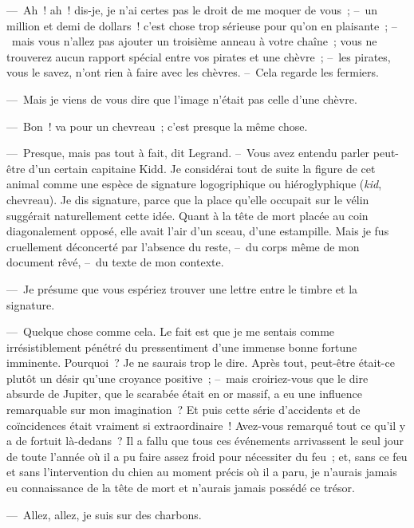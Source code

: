 \documentclass[french,twoside]{book} %
\begin{document}
— Ah ! ah ! dis-je, je n’ai certes pas le droit de me moquer de vous ; – un million et demi de dollars ! c’est chose trop sérieuse pour qu’on en plaisante ; – mais vous n’allez pas ajouter un troisième anneau à votre chaîne ; vous ne trouverez aucun rapport spécial entre vos pirates et une chèvre ; – les pirates, vous le savez, n’ont rien à faire avec les chèvres. – Cela regarde les fermiers.\par
— Mais je viens de vous dire que l’image n’était pas celle d’une chèvre.\par
— Bon ! va pour un chevreau ; c’est presque la même chose.\par
— Presque, mais pas tout à fait, dit Legrand. – Vous avez entendu parler peut-être d’un certain capitaine Kidd. Je considérai tout de suite la figure de cet animal comme une espèce de signature logogriphique ou hiéroglyphique (\emph{kid}, chevreau). Je dis signature, parce que la place qu’elle occupait sur le vélin suggérait naturellement cette idée. Quant à la tête de mort placée au coin diagonalement opposé, elle avait l’air d’un sceau, d’une estampille. Mais je fus cruellement déconcerté par l’absence du reste, – du corps même de mon document rêvé, – du texte de mon contexte.\par
— Je présume que vous espériez trouver une lettre entre le timbre et la signature.\par
— Quelque chose comme cela. Le fait est que je me sentais comme irrésistiblement pénétré du pressentiment d’une immense bonne fortune imminente. Pourquoi ? Je ne saurais trop le dire. Après tout, peut-être était-ce plutôt un désir qu’une croyance positive ; – mais croiriez-vous que le dire absurde de Jupiter, que le scarabée était en or massif, a eu une influence remarquable sur mon imagination ? Et puis cette série d’accidents et de coïncidences était vraiment si extraordinaire ! Avez-vous remarqué tout ce qu’il y a de fortuit là-dedans ? Il a fallu que tous ces événements arrivassent le seul jour de toute l’année où il a pu faire assez froid pour nécessiter du feu ; et, sans ce feu et sans l’intervention du chien au moment précis où il a paru, je n’aurais jamais eu connaissance de la tête de mort et n’aurais jamais possédé ce trésor.\par
— Allez, allez, je suis sur des charbons.\par
\end{document}
